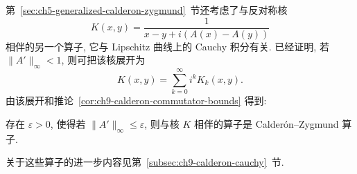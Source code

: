 \hypertarget{chapter-09-page-217}{}
第~\ref{sec:ch5-generalized-calderon-zygmund}~节还考虑了与反对称核
\[
 K(x,y)=\frac1{x-y+i(A(x)-A(y))}
\]
相伴的另一个算子, 它与 Lipschitz 曲线上的 Cauchy 积分有关. 已经证明, 若 $\|A'\|_\infty<1$, 则可把该核展开为
\[
 K(x,y)=\sum_{k=0}^\infty i^kK_k(x,y).
\]
由该展开和推论~\ref{cor:ch9-calderon-commutator-bounds} 得到:

\begin{Corollary}
\label{cor:ch9-small-lipschitz-cauchy}
存在 $\varepsilon>0$, 使得若 $\|A'\|_\infty\le\varepsilon$, 则与核 $K$ 相伴的算子是 Calderón--Zygmund 算子.
\end{Corollary}

关于这些算子的进一步内容见第~\ref{subsec:ch9-calderon-cauchy}~节.
